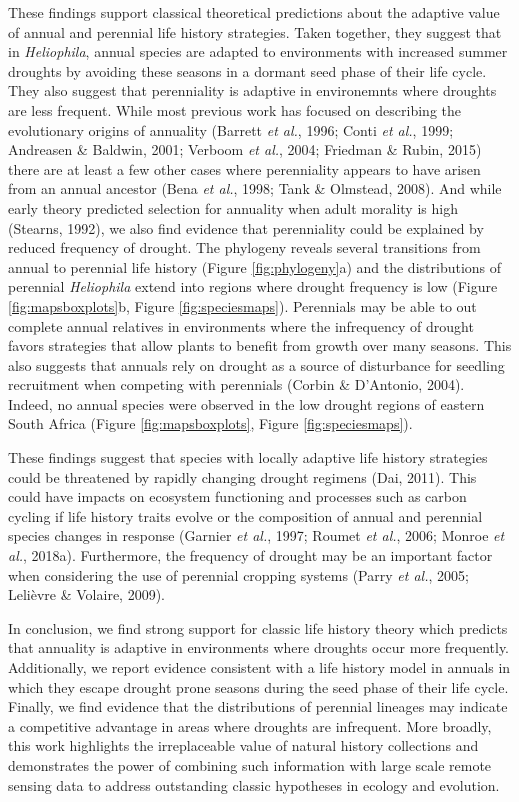 \documentclass[man,floatsintext]{apa6}
\theoremstyle{definition}
\theoremstyle{definition}
\theoremstyle{definition}
\theoremstyle{remark}
\begin{document}
These findings support classical theoretical predictions about the
adaptive value of annual and perennial life history strategies. Taken
together, they suggest that in \emph{Heliophila}, annual species are
adapted to environments with increased summer droughts by avoiding these
seasons in a dormant seed phase of their life cycle. They also suggest
that perenniality is adaptive in environemnts where droughts are less
frequent. While most previous work has focused on describing the
evolutionary origins of annuality (Barrett \emph{et al.}, 1996; Conti
\emph{et al.}, 1999; Andreasen \& Baldwin, 2001; Verboom \emph{et al.},
2004; Friedman \& Rubin, 2015) there are at least a few other cases
where perenniality appears to have arisen from an annual ancestor (Bena
\emph{et al.}, 1998; Tank \& Olmstead, 2008). And while early theory
predicted selection for annuality when adult morality is high (Stearns,
1992), we also find evidence that perenniality could be explained by
reduced frequency of drought. The phylogeny reveals several transitions
from annual to perennial life history (Figure \ref{fig:phylogeny}a) and
the distributions of perennial \emph{Heliophila} extend into regions
where drought frequency is low (Figure \ref{fig:mapsboxplots}b, Figure
\ref{fig:speciesmaps}). Perennials may be able to out complete annual
relatives in environments where the infrequency of drought favors
strategies that allow plants to benefit from growth over many seasons.
This also suggests that annuals rely on drought as a source of
disturbance for seedling recruitment when competing with perennials
(Corbin \& D'Antonio, 2004). Indeed, no annual species were observed in
the low drought regions of eastern South Africa (Figure
\ref{fig:mapsboxplots}, Figure \ref{fig:speciesmaps}).

These findings suggest that species with locally adaptive life history
strategies could be threatened by rapidly changing drought regimens
(Dai, 2011). This could have impacts on ecosystem functioning and
processes such as carbon cycling if life history traits evolve or the
composition of annual and perennial species changes in response (Garnier
\emph{et al.}, 1997; Roumet \emph{et al.}, 2006; Monroe \emph{et al.},
2018a). Furthermore, the frequency of drought may be an important factor
when considering the use of perennial cropping systems (Parry \emph{et
al.}, 2005; Lelièvre \& Volaire, 2009).

In conclusion, we find strong support for classic life history theory
which predicts that annuality is adaptive in environments where droughts
occur more frequently. Additionally, we report evidence consistent with
a life history model in annuals in which they escape drought prone
seasons during the seed phase of their life cycle. Finally, we find
evidence that the distributions of perennial lineages may indicate a
competitive advantage in areas where droughts are infrequent. More
broadly, this work highlights the irreplaceable value of natural history
collections and demonstrates the power of combining such information
with large scale remote sensing data to address outstanding classic
hypotheses in ecology and evolution.
\end{document}
